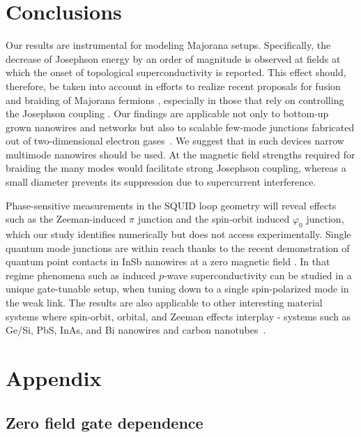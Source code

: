\section{Conclusions}
Our results are instrumental for modeling Majorana setups.
Specifically, the decrease of Josephson energy by an order of magnitude is observed at fields at which the onset of topological superconductivity is reported.
This effect should, therefore, be taken into account in efforts to realize recent proposals for fusion and braiding of Majorana fermions \cite{Hyart2013,Aasen2016,Plugge2017,Karzig2017}, especially in those that rely on controlling the Josephson coupling \cite{Hyart2013,Aasen2016,Plugge2017}.
Our findings are applicable not only to bottom-up grown nanowires and networks but also to scalable few-mode junctions fabricated out of two-dimensional electron gases~\cite{Nichele2017,Lee2019}.
We suggest that in such devices narrow multimode nanowires should be used.
At the magnetic field strengths required for braiding the many modes would facilitate strong Josephson coupling, whereas a small diameter prevents its suppression due to supercurrent interference.

Phase-sensitive measurements in the SQUID loop geometry will reveal effects  such as the Zeeman-induced  $\pi$ junction and the spin-orbit induced $\varphi_0$ junction, which our study identifies numerically but does not access experimentally.
Single quantum mode junctions are within reach thanks to the recent demonstration of quantum point contacts in InSb nanowires at a zero magnetic field \cite{Kammhuber2016}.
In that regime phenomena such as induced $p$-wave superconductivity can be studied in a unique gate-tunable setup, when tuning down to a single spin-polarized mode in the weak link.
The results are also applicable to other interesting material systems where spin-orbit, orbital,  and Zeeman effects interplay - systems such as Ge/Si, PbS, InAs, and  Bi nanowires and carbon nanotubes~\cite{Cleuziou2006}.

\section{Appendix}\label{sec:appendix_supercurrent}

\subsection{Zero field gate dependence}

